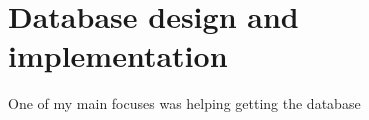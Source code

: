 \documentclass[]{article}
\title{}
\author{}
\begin{document}
\maketitle

\section{Database design and implementation}
One of my main focuses was helping getting the database 
\end{document}
